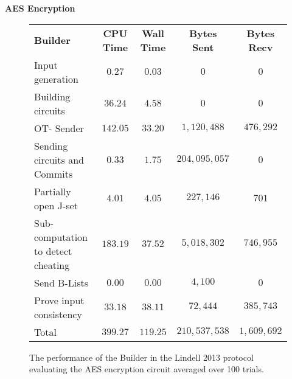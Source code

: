 \documentclass[ %
                    author={Nicholas Tutte},
                supervisor={Prof. Nigel Smart},
                    degree={MEng},
                     title={Secure Two Party Computation},
                  subtitle={A practical comparison of recent protocols},
                      type={Research - GG1K},
                      year={2015} ]{dissertation}
\begin{document}
				\FloatBarrier
				\noindent \textbf{AES Encryption}
				\begin{figure}[!ht]
					\begin{tabular}{| p{4.3cm} | c c c c |}
						\hline
						\textbf{Builder} & \textbf{CPU Time} & \textbf{Wall Time} & \textbf{Bytes Sent} & \textbf{Bytes Recv} \\
						\thickhline
						Input generation & $0.27$ & $0.03$ & $0$ & $0$ \\
						\hline
						Building circuits & $36.24$ & $4.58$ & $0$ & $0$ \\
						\hline
						OT- Sender & $142.05$ & $33.20$ & $1,120,488$ & $476,292$ \\
						\hline
						Sending circuits and Commits & $0.33$ & $1.75$ & $204,095,057$ & $0$ \\
						\hline
						Partially open J-set & $4.01$ & $4.05$ & $227,146$ & $701$ \\
						\hline
						Sub-computation to detect cheating & $183.19$ & $37.52$ & $5,018,302$ & $746,955$ \\
						\hline
						Send B-Lists & $0.00$ & $0.00$ & $4,100$ & $0$ \\
						\hline
						Prove input consistency & $33.18$ & $38.11$ & $72,444$ & $385,743$ \\
						\thickhline
						Total & $399.27$ & $119.25$ & $210,537,538$ & $1,609,692$ \\
						\hline
					\end{tabular}
					\caption{The performance of the Builder in the Lindell 2013 protocol evaluating the AES encryption circuit averaged over 100 trials. \label{table:L_2013_AES_Builder}}
				\end{figure}
\end{document}
